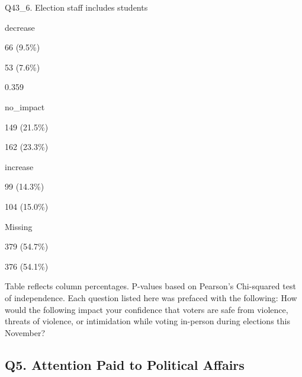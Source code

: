 \documentclass[
  11pt,
  a4paper,
]{article}
\begin{document}
\begin{table}
{Q43\_6. Election staff includes students

decrease

66 (9.5\%)

53 (7.6\%)

0.359

no\_impact

149 (21.5\%)

162 (23.3\%)

increase

99 (14.3\%)

104 (15.0\%)

Missing

379 (54.7\%)

376 (54.1\%)

Table reflects column percentages. P-values based on Pearson's
Chi-squared test of independence. Each question listed here was prefaced
with the following: How would the following impact your confidence that
voters are safe from violence, threats of violence, or intimidation
while voting in-person during elections this November?

}

\end{table}%

\subsection{}\label{section}

\subsection{Q5. Attention Paid to Political
Affairs}\label{q5.-attention-paid-to-political-affairs}
\end{document}
